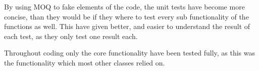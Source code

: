 By using MOQ to fake elements of the code, the unit tests have become more concise, than they would be if they where to test every sub functionality of the functions as well. This have given better, and easier to understand the result of each test, as they only test one result each. \par

Throughout coding only the core functionality have been tested fully, as this was the functionality which most other classes relied on. 